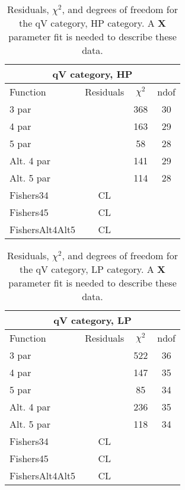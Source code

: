 \begin{table}[htb]
\centering
\begin{tabular}{|l c c c |}
\hline
\multicolumn{4}{|c|}{qV category, HP}\\
\hline
Function & Residuals & $\chi^2$ & ndof \\
\hline
3 par &  & 368 & 30 \\
4 par &  & 163 & 29 \\
5 par &  & 58 & 28 \\
Alt. 4 par&  & 141 & 29 \\
Alt. 5 par&  & 114 & 28 \\
\hline
\hline
Fishers34 \multicolumn{2}{l}{}&CL \multicolumn{2}{l|}{}\\
Fishers45 \multicolumn{2}{l}{}&CL \multicolumn{2}{l|}{}\\
FishersAlt4Alt5 \multicolumn{2}{l}{}&CL \multicolumn{2}{l|}{}\\
\hline
\end{tabular}
\caption{Residuals, $\chi^{2}$, and degrees of freedom for the qV category, HP category. A \textbf{X} parameter fit is needed to describe these data.}
\label{tab:qV category, HP}
\end{table}
\begin{table}[htb]
\centering
\begin{tabular}{|l c c c |}
\hline
\multicolumn{4}{|c|}{qV category, LP}\\
\hline
Function & Residuals & $\chi^2$ & ndof \\
\hline
3 par &  & 522 & 36 \\
4 par &  & 147 & 35 \\
5 par &  & 85  & 34 \\
Alt. 4 par&  & 236 & 35 \\
Alt. 5 par&  & 118 & 34 \\
\hline
\hline
Fishers34 \multicolumn{2}{l}{}&CL \multicolumn{2}{l|}{}\\
Fishers45 \multicolumn{2}{l}{}&CL \multicolumn{2}{l|}{}\\
FishersAlt4Alt5 \multicolumn{2}{l}{}&CL \multicolumn{2}{l|}{}\\
\hline
\end{tabular}
\caption{Residuals, $\chi^{2}$, and degrees of freedom for the qV category, LP category. A \textbf{X} parameter fit is needed to describe these data.}
\label{tab:qV category, LP}
\end{table}
